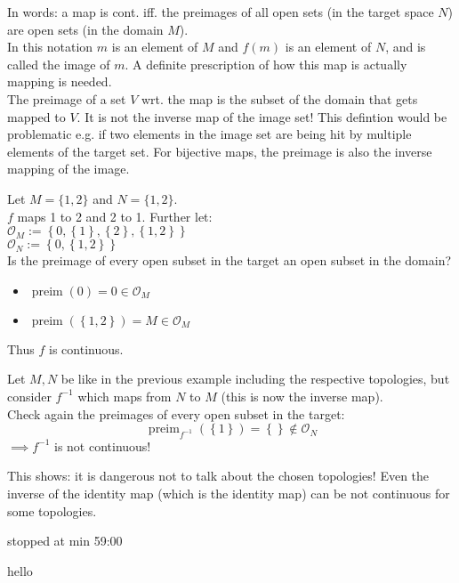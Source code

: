 In words: a map is cont. iff. the preimages of all open sets (in the target space $N$) are open sets (in the domain $M$).\\

In this notation $m$ is an element of $M$ and $f(m)$ is an element of $N$, and is called the image of $m$. A definite prescription of how this map is actually mapping is needed.\\
The preimage of a set $V$ wrt. the map is the subset of the domain that gets mapped to $V$. It is not the inverse map of the image set! This defintion would be problematic e.g. if two elements in the image set are being hit by multiple elements of the target set. For bijective maps, the preimage is also the inverse mapping of the image.

\begin{example}
    Let $M=\{1,2\}$ and $N=\{1,2\}$.\\
    $f$ maps 1 to 2 and 2 to 1. Further let:\\
    $\mathcal{O}_M := \left \{ 0, \left \{ 1 \right \}, \left \{ 2 \right \} , \left \{ 1,2 \right \} \right \}$ \\
    $\mathcal{O}_N := \left \{ 0, \left \{ 1,2 \right \} \right \}$ \\
    Is the preimage of every open subset in the target an open subset in the domain?
    \begin{itemize}[itemsep=3pt, topsep=3pt]
        \item $\operatorname{preim} (0) = 0 \in \mathcal{O}_M$
        \item $\operatorname{preim} \left ( \left \{ 1,2 \right \} \right ) = M \in \mathcal{O}_M$
    \end{itemize}
    Thus $f$ is continuous.
\end{example}

\begin{example}
    Let $M,N$ be like in the previous example including the respective topologies, but consider $f^{-1}$ which maps from $N$ to $M$ (this is now the inverse map).\\
    Check again the preimages of every open subset in the target:
    $$\operatorname{preim}_{f^{-1}} \left ( \left \{ 1 \right \} \right ) = \left \{  \right \} \notin \mathcal{O}_N$$
    $\implies f^{-1}$ is not continuous!
\end{example}

This shows: it is dangerous not to talk about the chosen topologies! Even the inverse of the identity map (which is the identity map) can be not continuous for some topologies.

stopped at min 59:00


hello